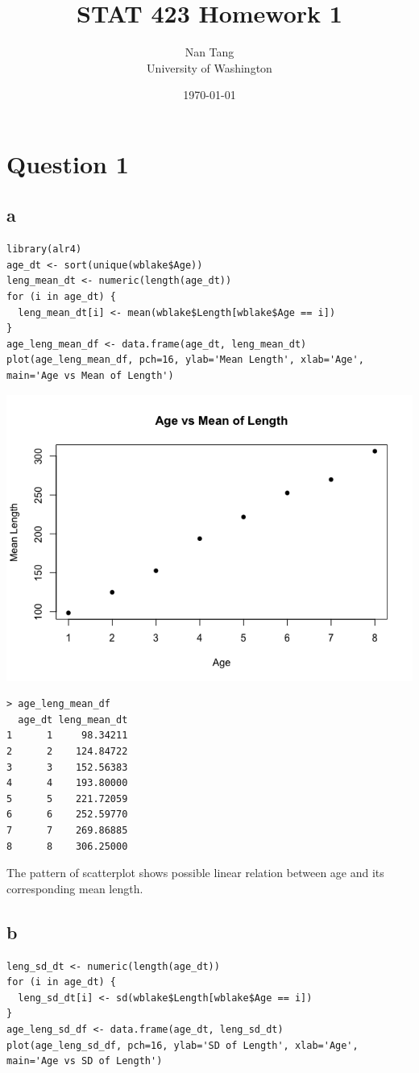 \documentclass[11pt,letterpaper]{article}
\title{STAT 423 Homework 1}
\author{Nan Tang \\ University of Washington}
\date{\today}
\begin{document}
\maketitle

\section*{Question 1}
\subsection*{a}
\begin{verbatim}
library(alr4)
age_dt <- sort(unique(wblake$Age))
leng_mean_dt <- numeric(length(age_dt))
for (i in age_dt) {
  leng_mean_dt[i] <- mean(wblake$Length[wblake$Age == i])
}
age_leng_mean_df <- data.frame(age_dt, leng_mean_dt)
plot(age_leng_mean_df, pch=16, ylab='Mean Length', xlab='Age', main='Age vs Mean of Length')
\end{verbatim}

\includegraphics[scale=0.6]{1-a-1.png}

\begin{verbatim}
> age_leng_mean_df
  age_dt leng_mean_dt
1      1     98.34211
2      2    124.84722
3      3    152.56383
4      4    193.80000
5      5    221.72059
6      6    252.59770
7      7    269.86885
8      8    306.25000
\end{verbatim}

\noindent The pattern of scatterplot shows possible linear relation between age and its corresponding mean length.

\subsection*{b}
\begin{verbatim}
leng_sd_dt <- numeric(length(age_dt))
for (i in age_dt) {
  leng_sd_dt[i] <- sd(wblake$Length[wblake$Age == i])
}
age_leng_sd_df <- data.frame(age_dt, leng_sd_dt)
plot(age_leng_sd_df, pch=16, ylab='SD of Length', xlab='Age', main='Age vs SD of Length')
\end{verbatim}
\end{document}
